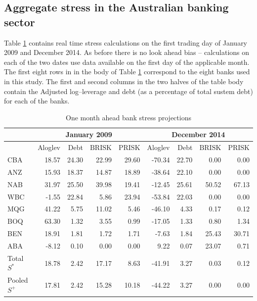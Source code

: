 \documentclass[authoryear]{elsarticle}
\newcommand{\E}{\mathrm{E}}
\newcommand{\br}{\ensuremath{\mathrm{BRISK}}}
\newcommand{\pr}{\ensuremath{\mathrm{PRISK}}}
\newcommand{\tref}[1]{Table \ref{#1}}
\begin{document}
\subsection{Aggregate stress in the Australian banking sector}\label{monitoring}
 \tref{twodates} contains real time stress calculations on the first trading day of  January 2009 and December 2014.  As before there is no look ahead bias -- calculations on each of the two dates use data available on the first day of the applicable month.   The first eight rows in in the body of \tref{twodates} correspond to the eight banks used in this study.  The first  and second columns in the two halves of the table body contain the 
 Adjusted log--leverage  and debt  (as a percentage of total sustem debt) for each of the banks. 

\begin{table}[ht]
\caption{One month ahead bank stress projections}
\label{twodates}
\centering
\begin{threeparttable}
\small
\vspace{4mm}
\begin{tabular}{l|rrrr|rrrr}
\hline
&\multicolumn{4}{c|}{January 2009}&\multicolumn{4}{c}{December 2014}\\
  \hline
   & Aloglev& Debt & \br  & \pr  & Aloglev & Debt  &\br & \pr\\  
  \hline
CBA & 18.57 & 24.30 & 22.99 & 29.60 & -70.34 & 22.70 & 0.00 & 0.00 \\ 
  ANZ & 15.93 & 18.37 & 14.87 & 18.89 & -38.64 & 22.10 & 0.00 & 0.00 \\ 
  NAB & 31.97 & 25.50 & 39.98 & 19.41 & -12.45 & 25.61 & 50.52 & 67.13 \\ 
  WBC & -1.55 & 22.84 & 5.86 & 23.94 & -53.84 & 22.03 & 0.00 & 0.00 \\ 
  MQG & 41.22 & 5.75 & 11.02 & 5.46 & -46.10 & 4.33 & 0.17 & 0.12 \\ 
  BOQ & 63.30 & 1.32 & 3.55 & 0.99 & -17.05 & 1.33 & 0.80 & 1.34 \\ 
  BEN & 18.91 & 1.81 & 1.72 & 1.71 & -7.63 & 1.84 & 25.43 & 30.71 \\ 
  ABA & -8.12 & 0.10 & 0.00 & 0.00 & 9.22 & 0.07 & 23.07 & 0.71 \\ 
  \hline
  Total $S^*$ & 18.78 & 2.42 & 17.17 & 8.63 & -41.91 & 3.27 & 0.03 & 0.12 \\ 
  Pooled $S^+$ & 17.81 & 2.42 & 15.28 & 10.18 & -44.22 & 3.27 & 0.00 & 0.00 \\ \hline

\end{tabular}
\end{threeparttable}
\end{table}
\end{document}
